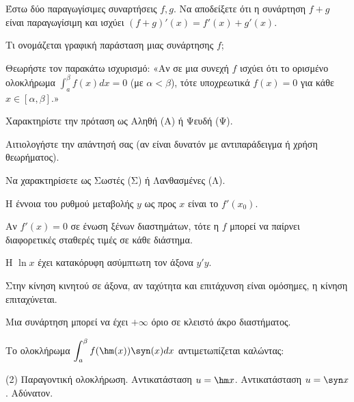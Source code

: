 \documentclass[11pt,a4paper]{article}
\newcommand{\kerkissans}[1]{{\fontfamily{maksf}\selectfont \textbf{#1}}}
\renewcommand{\textdexiakeraia}{}
\newcommand{\dint}{\displaystyle\int}
\newcommand\themanum{A}
\newcounter{thema}[section]
\renewcommand{\thethema}{\arabic{thema}}
\newcommand{\Thema}{\refstepcounter{thema}{\textbf{\textcolor{black}{\faPenSquare\ \  \large \kerkissans{\textbf{\thethemaο\hspace{2mm}Διαγώνισμα - Θέμα \themanum}}}}}\hspace{0mm}}{}
\newenvironment{thema}[1]
{\begin{tcolorbox}[title=\Thema\kerkissans{\textbf{\large{  #1}}},breakable,
enhanced standard,titlerule=0pt,toprule=0pt, rightrule=0pt, bottomrule=0pt,
colback=white,left=0mm,top=1mm,bottom=0mm,
boxrule=0pt,
colframe=white,leftrule=0mm,sharp corners,coltitle=black]
\renewcommand{\themanum}{#1}}
{\end{tcolorbox}}
\begin{document}
\begin{thema}{A}
\begin{erwthma}
    \item Έστω δύο παραγωγίσιμες συναρτήσεις $f, g$. Να αποδείξετε ότι η συνάρτηση $f+g$ είναι παραγωγίσιμη και ισχύει $(f+g)'(x) = f'(x) + g'(x)$.
    \item Τι ονομάζεται γραφική παράσταση μιας συνάρτησης $f$;
    \item Θεωρήστε τον παρακάτω ισχυρισμό:
    «Αν σε μια συνεχή $f$ ισχύει ότι το ορισμένο ολοκλήρωμα $\dint_a^\beta f(x)dx = 0$ (με $\alpha<\beta$), τότε υποχρεωτικά $f(x)=0$ για κάθε $x \in [\alpha, \beta]$.»
    \begin{alist}
    \item Χαρακτηρίστε την πρόταση ως Αληθή (Α) ή Ψευδή (Ψ).
    \item Αιτιολογήστε την απάντησή σας (αν είναι δυνατόν με αντιπαράδειγμα ή χρήση θεωρήματος).
    \end{alist}
    \item Να χαρακτηρίσετε ως Σωστές (Σ) ή Λανθασμένες (Λ).
    \begin{alist}
        \item Η έννοια του ρυθμού μεταβολής $y$ ως προς $x$ είναι το $f'(x_0)$.
        \item Αν $f'(x) = 0$ σε ένωση ξένων διαστημάτων, τότε η $f$ μπορεί να παίρνει διαφορετικές σταθερές τιμές σε κάθε διάστημα.
        \item H $\ln x$ έχει κατακόρυφη ασύμπτωτη τον άξονα $y'y$.
        \item Στην κίνηση κινητού σε άξονα, αν ταχύτητα και επιτάχυνση είναι ομόσημες, η κίνηση επιταχύνεται.
        \item Μια συνάρτηση μπορεί να έχει $+\infty$ όριο σε κλειστό άκρο διαστήματος.
    \end{alist}
    \item Το ολοκλήρωμα $\dint_{a}^{\beta} f(\hm(x)) \syn(x) dx$ αντιμετωπίζεται καλώντας:
    \begin{tasks}[label=\let\textdexiakeraia\relax\alph*.](2)
        \task Παραγοντική ολοκλήρωση.
        \task Αντικατάσταση $u = \hm x$.
        \task Αντικατάσταση $u = \syn x$.
        \task Αδύνατον.
    \end{tasks}
\end{erwthma}
\end{thema}
\vspace{1cm}
\end{document}
